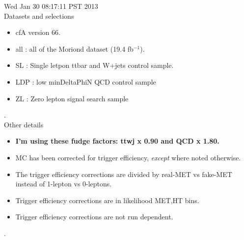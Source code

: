 \documentclass[11pt]{article}
\begin{document}
   Wed Jan 30 08:17:11 PST 2013 \\

   Datasets and selections
   \begin{itemize}
     \item cfA version 66.
     \item all : all of the Moriond dataset (19.4 fb$^{-1}$).
     \item SL : Single letpon ttbar and W+jets control sample.
     \item LDP : low minDeltaPhiN QCD control sample
     \item ZL : Zero lepton signal search sample
   \end{itemize}

.\\

   Other details
   \begin{itemize}
     \item {\bf I'm using these fudge factors: ttwj x 0.90 and QCD x 1.80.}
     \item MC has been corrected for trigger efficiency, {\it except} where noted otherwise.
     \item  The trigger efficiency corrections are divided by real-MET vs fake-MET
             instead of 1-lepton vs 0-leptons.
     \item Trigger efficiency corrections are in likelihood MET,HT bins.
     \item Trigger efficiency corrections are not run dependent.
   \end{itemize}

.\\



  \pagebreak
  \clearpage
  \tableofcontents
  \clearpage





\end{document}
